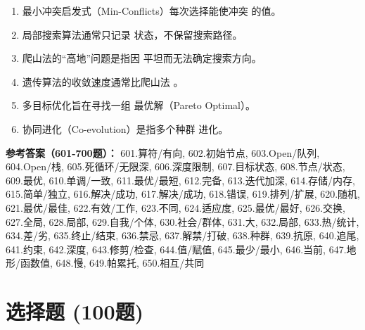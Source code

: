 \begin{enumerate}[resume,leftmargin=2em,itemsep=1pt]
\item 最小冲突启发式（Min-Conflicts）每次选择能使冲突 \underline{\hspace{3em}} 的值。
\item 局部搜索算法通常只记录 \underline{\hspace{3em}} 状态，不保留搜索路径。
\item 爬山法的“高地”问题是指因 \underline{\hspace{3em}} 平坦而无法确定搜索方向。
\item 遗传算法的收敛速度通常比爬山法 \underline{\hspace{3em}}。
\item 多目标优化旨在寻找一组 \underline{\hspace{3em}} 最优解（Pareto Optimal）。
\item 协同进化（Co-evolution）是指多个种群 \underline{\hspace{3em}} 进化。
\end{enumerate}

\textbf{参考答案（601-700题）：}
601.算符/有向, 602.初始节点, 603.Open/队列, 604.Open/栈, 605.死循环/无限深, 606.深度限制, 607.目标状态, 608.节点/状态, 609.最优, 610.单调/一致, 611.最优/最短, 612.完备, 613.迭代加深, 614.存储/内存, 615.简单/独立, 616.解决/成功, 617.解决/成功, 618.错误, 619.排列/扩展, 620.随机, 621.最优/最佳, 622.有效/工作, 623.不同, 624.适应度, 625.最优/最好, 626.交换, 627.全局, 628.局部, 629.自我/个体, 630.社会/群体, 631.大, 632.局部, 633.热/统计, 634.差/劣, 635.终止/结束, 636.禁忌, 637.解禁/打破, 638.种群, 639.抗原, 640.追尾, 641.约束, 642.深度, 643.修剪/检查, 644.值/赋值, 645.最少/最小, 646.当前, 647.地形/函数值, 648.慢, 649.帕累托, 650.相互/共同







\section{选择题 (100题)}

